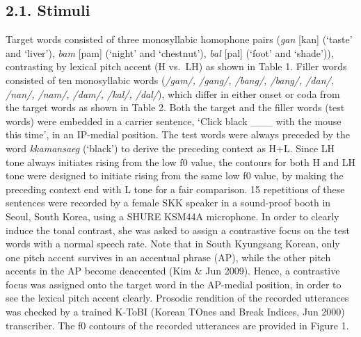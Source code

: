 \documentclass[
  man,floatsintext]{apa6}
\begin{document}
\hypertarget{stimuli}{%
\subsection{2.1. Stimuli}\label{stimuli}}

Target words consisted of three monosyllabic homophone pairs (\emph{gan} {[}kan{]} (`taste' and `liver'), \emph{bam} {[}pam{]} (`night' and `chestnut'), \emph{bal} {[}pal{]} (`foot' and `shade')), contrasting by lexical pitch accent (H vs.~LH) as shown in Table 1. Filler words consisted of ten monosyllabic words (\emph{/gam/, /gang/, /bang/, /bang/, /dan/, /nan/, /nam/, /dam/, /kal/, /dal/}), which differ in either onset or coda from the target words as shown in Table 2. Both the target and the filler words (test words) were embedded in a carrier sentence, `Click black \_\_\_ with the mouse this time', in an IP-medial position. The test words were always preceded by the word \emph{kkamansaeg} (`black') to derive the preceding context as H+L. Since LH tone always initiates rising from the low f0 value, the contours for both H and LH tone were designed to initiate rising from the same low f0 value, by making the preceding context end with L tone for a fair comparison. 15 repetitions of these sentences were recorded by a female SKK speaker in a sound-proof booth in Seoul, South Korea, using a SHURE KSM44A microphone. In order to clearly induce the tonal contrast, she was asked to assign a contrastive focus on the test words with a normal speech rate. Note that in South Kyungsang Korean, only one pitch accent survives in an accentual phrase (AP), while the other pitch accents in the AP become deaccented (Kim \& Jun 2009). Hence, a contrastive focus was assigned onto the target word in the AP-medial position, in order to see the lexical pitch accent clearly. Prosodic rendition of the recorded utterances was checked by a trained K-ToBI (Korean TOnes and Break Indices, Jun 2000) transcriber. The f0 contours of the recorded utterances are provided in Figure 1.

\newpage
\end{document}
